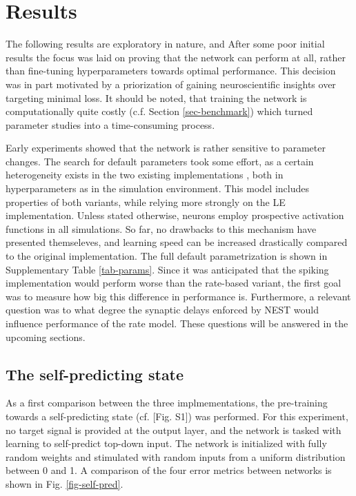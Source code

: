 
\chapter{Results}

The following results are exploratory in nature, and After some poor initial results the focus was laid on proving that
the network can perform at all, rather than fine-tuning hyperparameters towards optimal performance. This decision was
in part motivated by a priorization of gaining neuroscientific insights over targeting minimal loss. It should be
noted, that training the network is computationally quite costly (c.f. Section \ref{sec-benchmark}) which turned
parameter studies into a time-consuming process. 

Early experiments showed that the network is rather sensitive to parameter changes. The search for default parameters
took some effort, as a certain heterogeneity exists in the two existing implementations
\citep{sacramento2018dendritic,Haider2021}, both in hyperparameters as in the simulation environment. This model
includes properties of both variants, while relying more strongly on the LE implementation. Unless stated otherwise,
neurons employ prospective activation functions in all simulations. So far, no drawbacks to this mechanism have
presented themseleves, and learning speed can be increased drastically compared to the original implementation. The full
default parametrization is shown in Supplementary Table \ref{tab-params}. Since it was anticipated that the spiking
implementation would perform worse than the rate-based variant, the first goal was to measure how big this difference in
performance is. Furthermore, a relevant question was to what degree the synaptic delays enforced by NEST would
influence performance of the rate model. These questions will be answered in the upcoming sections.


\section{The self-predicting state}

As a first comparison between the three implmementations, the pre-training towards a self-predicting state (cf.
\cite{sacramento2018dendritic}[Fig. S1]) was performed. For this experiment, no target signal is provided at the output
layer, and the network is tasked with learning to self-predict top-down input. The network is initialized with fully
random weights and stimulated with random inputs from a uniform distribution between 0 and 1. A comparison of the four
error metrics between networks is shown in Fig. \ref{fig-self-pred}.



